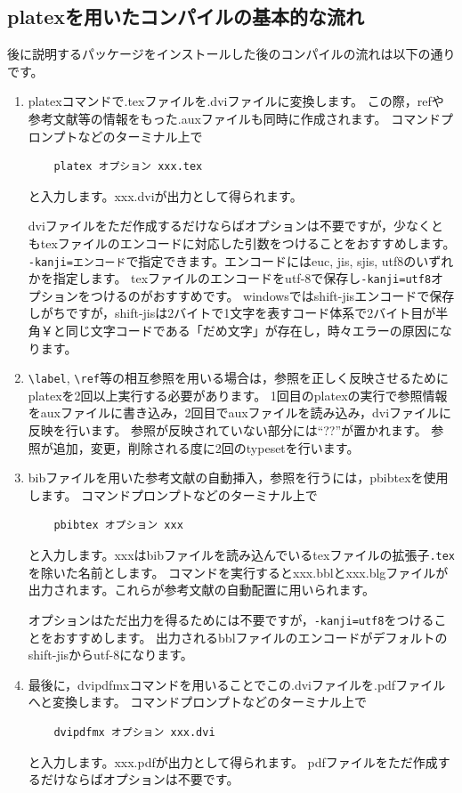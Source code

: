 \documentclass[10pt,a4paper,oneside,twocolumn,fleqn,dvipdfmx]{jsarticle}
\begin{document}
\subsection{platexを用いたコンパイルの基本的な流れ}
後に説明するパッケージをインストールした後のコンパイルの流れは以下の通りです。
\begin{enumerate}
\item platexコマンドで.texファイルを.dviファイルに変換します。
この際，refや参考文献等の情報をもった.auxファイルも同時に作成されます。
コマンドプロンプトなどのターミナル上で
\begin{verbatim}
	platex オプション xxx.tex
\end{verbatim}
と入力します。xxx.dviが出力として得られます。

dviファイルをただ作成するだけならばオプションは不要ですが，少なくともtexファイルのエンコードに対応した引数をつけることをおすすめします。
\verb|-kanji=エンコード|で指定できます。エンコードにはeuc, jis, sjis, utf8のいずれかを指定します。
texファイルのエンコードをutf-8で保存し\verb|-kanji=utf8|オプションをつけるのがおすすめです。
windowsではshift-jisエンコードで保存しがちですが，shift-jisは2バイトで1文字を表すコード体系で2バイト目が半角￥と同じ文字コードである「だめ文字」が存在し，時々エラーの原因になります。

\item
\verb|\label|, \verb|\ref|等の相互参照を用いる場合は，参照を正しく反映させるためにplatexを2回以上実行する必要があります。
1回目のplatexの実行で参照情報をauxファイルに書き込み，2回目でauxファイルを読み込み，dviファイルに反映を行います。
参照が反映されていない部分には``??''が置かれます。
参照が追加，変更，削除される度に2回のtypesetを行います。

\item
bibファイルを用いた参考文献の自動挿入，参照を行うには，pbibtexを使用します。
コマンドプロンプトなどのターミナル上で
\begin{verbatim}
	pbibtex オプション xxx
\end{verbatim}
と入力します。xxxはbibファイルを読み込んでいるtexファイルの拡張子\texttt{.tex}を除いた名前とします。
コマンドを実行するとxxx.bblとxxx.blgファイルが出力されます。これらが参考文献の自動配置に用いられます。

オプションはただ出力を得るためには不要ですが，\verb|-kanji=utf8|をつけることをおすすめします。
出力されるbblファイルのエンコードがデフォルトのshift-jisからutf-8になります。

\item 最後に，dvipdfmxコマンドを用いることでこの.dviファイルを.pdfファイルへと変換します。
コマンドプロンプトなどのターミナル上で
\begin{verbatim}
	dvipdfmx オプション xxx.dvi
\end{verbatim}
と入力します。xxx.pdfが出力として得られます。
pdfファイルをただ作成するだけならばオプションは不要です。
\end{enumerate}
\end{document}
